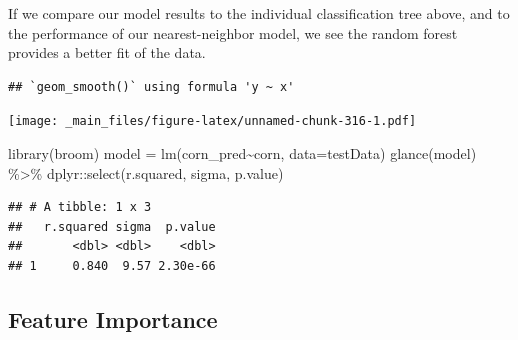 \documentclass[
]{book}
\newenvironment{Shaded}{\begin{snugshade}}{\end{snugshade}}
\newcommand{\AttributeTok}[1]{\textcolor[rgb]{0.77,0.63,0.00}{#1}}
\newcommand{\FunctionTok}[1]{\textcolor[rgb]{0.00,0.00,0.00}{#1}}
\newcommand{\NormalTok}[1]{#1}
\newcommand{\OtherTok}[1]{\textcolor[rgb]{0.56,0.35,0.01}{#1}}
\newcommand{\SpecialCharTok}[1]{\textcolor[rgb]{0.00,0.00,0.00}{#1}}
\newcommand{\StringTok}[1]{\textcolor[rgb]{0.31,0.60,0.02}{#1}}
\begin{document}
If we compare our model results to the individual classification tree above, and to the performance of our nearest-neighbor model, we see the random forest provides a better fit of the data.

\begin{Shaded}
\end{Shaded}

\begin{verbatim}
## `geom_smooth()` using formula 'y ~ x'
\end{verbatim}

\texttt{[image: \_main\_files/figure-latex/unnamed-chunk-316-1.pdf]}

\begin{Shaded}
\begin{Highlighting}[]
\FunctionTok{library}\NormalTok{(broom)}
\NormalTok{model }\OtherTok{=} \FunctionTok{lm}\NormalTok{(corn\_pred}\SpecialCharTok{\textasciitilde{}}\NormalTok{corn, }\AttributeTok{data=}\NormalTok{testData)}
\FunctionTok{glance}\NormalTok{(model) }\SpecialCharTok{\%\textgreater{}\%}
\NormalTok{  dplyr}\SpecialCharTok{::}\FunctionTok{select}\NormalTok{(r.squared, sigma, p.value) }
\end{Highlighting}
\end{Shaded}

\begin{verbatim}
## # A tibble: 1 x 3
##   r.squared sigma  p.value
##       <dbl> <dbl>    <dbl>
## 1     0.840  9.57 2.30e-66
\end{verbatim}

\hypertarget{feature-importance}{%
\subsection{Feature Importance}\label{feature-importance}}
\end{document}

